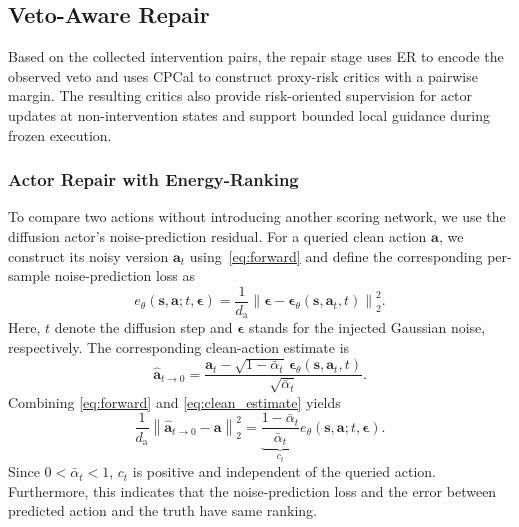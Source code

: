 \documentclass[9pt,journal]{IEEEtran}
\newcommand{\va}{\bm{a}}
\newcommand{\vs}{\bm{s}}
\newcommand{\veps}{\bm{\epsilon}}
\begin{document}
\subsection{Veto-Aware Repair}
\label{sec:repair}

Based on the collected intervention pairs, the repair stage uses ER to encode the observed veto and uses CPCal to construct proxy-risk critics with a pairwise margin. The resulting critics also
provide risk-oriented supervision for actor updates at
non-intervention states and support bounded local guidance during
frozen execution.

\subsubsection{Actor Repair with Energy-Ranking}
\label{sec:energyrank}
To compare two actions without introducing another scoring network, we use the diffusion actor's noise-prediction residual. For a queried clean action $\va$, we construct its noisy version $\va_t$ using~\eqref{eq:forward} and define the corresponding per-sample noise-prediction loss as
\begin{equation}
    e_\theta\!\left(\vs,\va;t,\veps\right)
    =
    \frac{1}{d_{\mathrm a}}
    \left\|
    \veps-
    \veps_\theta\!\left(\vs,\va_t,t\right)
    \right\|_2^2 .
    \label{eq:noise_prediction_loss}
\end{equation}
Here, $t$ denote the diffusion step and $\veps$ stands for the
injected Gaussian noise, respectively. The corresponding
clean-action estimate is
\begin{equation}
    \widehat{\va}_{t\rightarrow0}
    =
    \frac{
    \va_t-
    \sqrt{1-\bar\alpha_t}\,
    \veps_\theta\!\left(\vs,\va_t,t\right)
    }{
    \sqrt{\bar\alpha_t}
    }.
    \label{eq:clean_estimate}
\end{equation}
Combining \eqref{eq:forward} and
\eqref{eq:clean_estimate} yields
\begin{equation}
    \frac{1}{d_{\mathrm a}}
    \left\|
    \widehat{\va}_{t\rightarrow0}-\va
    \right\|_2^2
    =
    \underbrace{
    \frac{1-\bar\alpha_t}{\bar\alpha_t}
    }_{c_t}
    e_\theta\!\left(\vs,\va;t,\veps\right).
    \label{eq:residual_reconstruction}
\end{equation}
Since $0<\bar\alpha_t<1$, $c_t$ is positive and independent of
the queried action. 
Furthermore, this indicates that the noise-prediction loss and the error between predicted action and the truth have same ranking.
\end{document}
